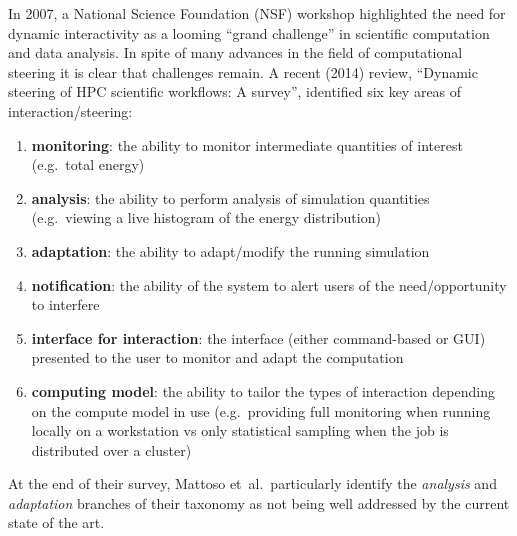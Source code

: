 \documentclass[a4paper,fontsize=12pt]{scrartcl}
\begin{document}
In 2007, a National Science Foundation (NSF)
workshop\parencite{Gil2007} highlighted the need for dynamic
interactivity as a looming ``grand challenge'' in scientific
computation and data analysis.
In spite of many advances in the field of computational steering it is
clear that challenges remain. A recent (2014) review, ``Dynamic
steering of HPC scientific workflows: A survey''\parencite{Mattoso},
identified six key areas of interaction/steering:
\begin{enumerate}
\item \textbf{monitoring}: the ability to monitor intermediate
  quantities of interest (e.g.~total energy)
\item \textbf{analysis}: the ability to perform analysis of simulation
  quantities (e.g.~viewing a live histogram of the energy
  distribution)
\item \textbf{adaptation}: the ability to adapt/modify the running
  simulation
\item \textbf{notification}: the ability of the system to alert users of the
  need/opportunity to interfere
\item \textbf{interface for interaction}: the interface (either command-based
  or GUI) presented to the user to monitor and adapt the computation
\item \textbf{computing model}: the ability to tailor the types of interaction
  depending on the compute model in use (e.g.~providing full
  monitoring when running locally on a workstation vs only statistical
  sampling when the job is distributed over a cluster)
\end{enumerate}
At the end of their survey, Mattoso et~al.~particularly identify the
\emph{analysis} and \emph{adaptation} branches of their taxonomy as
not being well addressed by the current state of the art.
\end{document}
